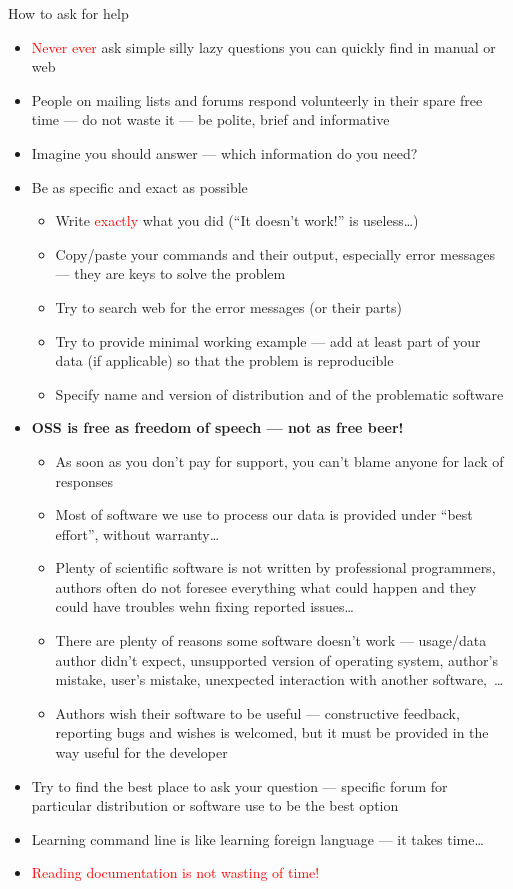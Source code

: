 \documentclass[compress, ucs, xelatex, 11pt, xcolor=svgnames, aspectratio=169,
	hyperref={
		bookmarks=true,
		unicode=true,
		colorlinks=true,
		pdftitle={Linux, command line and MetaCentrum},
		plainpages=false,
		pdfauthor={Vojtech Zeisek},
		pdfsubject={Course about use of Linux command line, writing shell scripts and using MetaCentrum of CESNET},
		pdfcreator={XeLaTeX},
		pdfkeywords={Linux, GNU, BASH, shell, command line, MetaCentrum},
		linkcolor=DarkRed, %
		anchorcolor=DarkBlue, %
		citecolor=Indigo, %
		filecolor=NavyBlue, %
		menucolor=DarkMagenta, %
		urlcolor=DarkBlue, %
		pdftex},
	url={hyphens, lowtilde} %
	]{beamer}
\renewcommand{\alert}[1]{\textcolor{red}{#1}}
\begin{document}
\begin{frame}[allowframebreaks]{How to ask for help}
	\label{howtoask}
	\begin{itemize}
		\item \alert{Never ever} ask simple silly lazy questions you can quickly find in manual or web
		\item People on mailing lists and forums respond volunteerly in their spare free time --- do not waste it --- be polite, brief and informative
		\item Imagine you should answer --- which information do you need?
		\item Be as specific and exact as possible
		\begin{itemize}
			\item Write \alert{exactly} what you did (\enquote{It doesn't work!} is useless\ldots)
			\item Copy/paste your commands and their output, especially error messages --- they are keys to solve the problem
			\item Try to search web for the error messages (or their parts)
			\item Try to provide minimal working example --- add at least part of your data (if applicable) so that the problem is reproducible
			\item Specify name and version of distribution and of the problematic software
		\end{itemize}
		\item \textbf{OSS is free as freedom of speech --- not as free beer!}
		\begin{itemize}
			\item As soon as you don't pay for support, you can't blame anyone for lack of responses
			\item Most of software we use to process our data is provided under \enquote{best effort}, without warranty\ldots
			\item Plenty of scientific software is not written by professional programmers, authors often do not foresee everything what could happen and they could have troubles wehn fixing reported issues\ldots
			\item There are plenty of reasons some software doesn't work --- usage/data author didn't expect, unsupported version of operating system, author's mistake, user's mistake, unexpected interaction with another software,~\ldots
			\item Authors wish their software to be useful --- constructive feedback, reporting bugs and wishes is welcomed, but it must be provided in the way useful for the developer
		\end{itemize}
		\item Try to find the best place to ask your question --- specific forum for particular distribution or software use to be the best option
		\item Learning command line is like learning foreign language --- it takes time\ldots
		\item \alert{Reading documentation is not wasting of time!}
	\end{itemize}
\end{frame}
\end{document}
